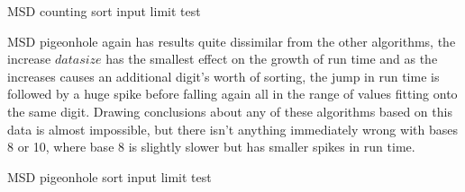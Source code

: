 \documentclass[12pt]{article}
\begin{document}
	\begin{table}[h]
		\centering
			\caption{MSD counting sort input limit test}
	\end{table}
	\pagebreak
	MSD pigeonhole again has results quite dissimilar from the other algorithms, the increase $data$\textunderscore $size$ has the smallest effect on the growth of run time and as the increases causes an additional digit's worth of sorting, the jump in run time is followed by a huge spike before falling again all in the range of values fitting onto the same digit. Drawing conclusions about any of these algorithms based on this data is almost impossible, but there isn't anything immediately wrong with bases 8 or 10, where base 8 is slightly slower but has smaller spikes in run time.
	\begin{table}[h]
		\centering
			\caption{MSD pigeonhole sort input limit test}
	\end{table}
\end{document}
